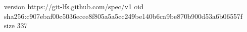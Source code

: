 version https://git-lfs.github.com/spec/v1
oid sha256:c907ebaf00c5036ecee8f805a5a5cc249be140b6ca9be870b900d53a6b06557f
size 337
